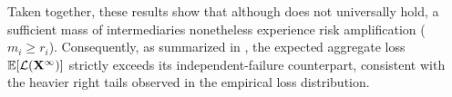 \documentclass[mnsc,nonblindrev]{informs3}
\newcommand{\Exp}[1]{\mathbb E \left[ #1 \right]} %
\newcommand{\GAR}{\mathcal{L}}
\newcommand{\Xvec}{\mathbf{X}}
\let\originalleft\left
\let\originalright\right
\renewcommand{\left}{\mathopen{}\mathclose\bgroup\originalleft}
\renewcommand{\right}{\aftergroup\egroup\originalright}
\begin{document}
\begin{APPENDICES}
Taken together, these results show that although  does not universally hold, a sufficient mass of intermediaries nonetheless experience risk amplification ($m_i \geq r_i$). Consequently, as summarized in , the expected aggregate loss $\Exp{\GAR(\Xvec^\infty)}$ strictly exceeds its independent-failure counterpart, consistent with the heavier right tails observed in the empirical loss distribution.
% 
% 
% 
\end{APPENDICES}









%

\end{document}

